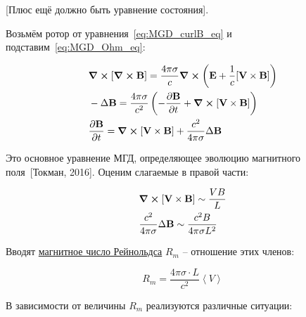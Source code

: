 \documentclass[10pt, a4paper]{article}
\newcommand{\Tokman}{~[Токман, 2016]}
\begin{document}
[Плюс ещё должно быть уравнение состояния].

Возьмём ротор от уравнения~\eqref{eq:MGD_curlB_eq} и подставим~\eqref{eq:MGD_Ohm_eq}:

\begin{align}
	&\curl{[\curl{\vb{B}}]} = \frac{4\pi\sigma}{c}\curl{\left( \vb{E} + \frac{1}{c}[\vb{V}\times\vb{B}] \right)} \\ \nonumber
	&-\Delta\vb{B} = \frac{4\pi\sigma}{c^2}\left( -\pdv{\vb{B}}{t} + \curl{[\vb{V}\times\vb{B}]} \right) \\ \nonumber
	&\pdv{\vb{B}}{t} = \curl{[\vb{V}\times\vb{B}]} + \frac{c^2}{4\pi\sigma}\Delta\vb{B} \label{eq:MGD_main_eq}
\end{align}

Это основное уравнение МГД, определяющее эволюцию магнитного поля\Tokman. Оценим слагаемые в правой части:

\begin{align*}
	&\curl{[\vb{V}\times\vb{B}]} \sim \frac{VB}{L} \\
	&\frac{c^2}{4\pi\sigma}\Delta\vb{B} \sim \frac{c^2B}{4\pi\sigma L^2}
\end{align*}

Вводят \uline{магнитное число Рейнольдса} $R_m$ -- отношение этих членов:

\begin{equation*}
	R_m = \frac{4\pi\sigma \cdot L}{c^2}\left\langle V\right\rangle 
\end{equation*}

В зависимости  от величины $R_m$ реализуются различные ситуации:
\end{document}
